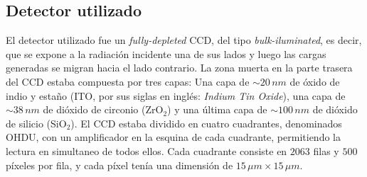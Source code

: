 \subsection{Detector utilizado}
\noindent El detector utilizado fue un \textit{fully-depleted} CCD, del tipo \textit{bulk-iluminated}, es decir, que se expone a la radiación incidente una de sus lados y luego las cargas generadas se migran hacia el lado contrario. La zona muerta en la parte trasera del CCD estaba compuesta por tres capas: Una capa de $\sim 20\,\si{nm}$ de óxido de indio y estaño (ITO, por sus siglas en inglés: \textit{Indium Tin Oxide}), una capa de $\sim 38\,\si{nm}$ de dióxido de circonio (ZrO$_{2}$) y una última capa de $\sim 100\,\si{nm}$ de dióxido de silicio (SiO$_{2}$). El CCD estaba dividido en cuatro cuadrantes, denominados OHDU, con un amplificador en la esquina de cada cuadrante, permitiendo la lectura en simultaneo de todos ellos. Cada cuadrante consiste en $2063$ filas y $500$ píxeles por fila, y cada píxel tenía una dimensión de $15\,\si{\mu m} \times 15\,\si{\mu m}$.
